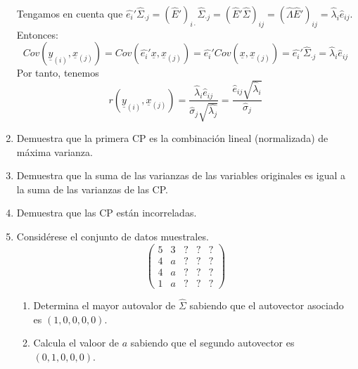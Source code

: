 \documentclass[twoside]{article}
\newcommand{\muestra}[1]{{\underline{#1}}}
\begin{document}
\begin{enumerate}
Tengamos en cuenta que $\hat{e_i}'\hat{\Sigma}_{\cdot j} = (\hat{E}')_{i \cdot}\hat{\Sigma}_{\cdot j}=(\hat{E}'\hat{\Sigma})_{ij}=(\hat{\Lambda}\hat{E}')_{ij}=\hat{\lambda}_i \hat{e}_{ij}$. Entonces:
$$
Cov(\muestra{y}_{{(i)}},\muestra{x}_{{(j)}}) = Cov(\hat{e_i}' \muestra{x},\muestra{x}_{{(j)}}) = \hat{e_i}'Cov(\muestra{x},\muestra{x}_{(j)})= \hat{e_i}'\hat{\Sigma}_{\cdot j} = \hat{\lambda}_i \hat{e}_{ij}
$$ 
Por tanto, tenemos
$$
r(\muestra{y}_{{(i)}},\muestra{x}_{{(j)}}) = \frac{\hat{\lambda}_i \hat{e}_{ij}}{\hat{\sigma}_{j}\sqrt{\hat{\lambda_j}}} = \frac{\hat{e}_{ij}\sqrt{\hat{\lambda}_i}}{\hat{\sigma}_j}
$$
\item Demuestra que la primera CP es la combinación lineal (normalizada) de máxima varianza. 
\item Demuestra que la suma de las varianzas de las variables originales es igual a la suma de las varianzas de las CP.
\item Demuestra que las CP están incorreladas.
\item Considérese el conjunto de datos muestrales.
\[ \begin{pmatrix}5 & 3 & ? & ? & ?\\4 & a & ? & ? & ?\\4 & a & ? & ? & ?\\1 & a & ? & ? & ?\end{pmatrix}\]
\begin{enumerate}
	\item Determina el mayor autovalor de $\widehat{\Sigma}$ sabiendo que el autovector asociado es $(1,0,0,0,0)$.
	\item Calcula el valoor de $a$ sabiendo que el segundo autovector es $(0,1,0,0,0)$.
\end{enumerate}
\end{enumerate}
\end{document}
